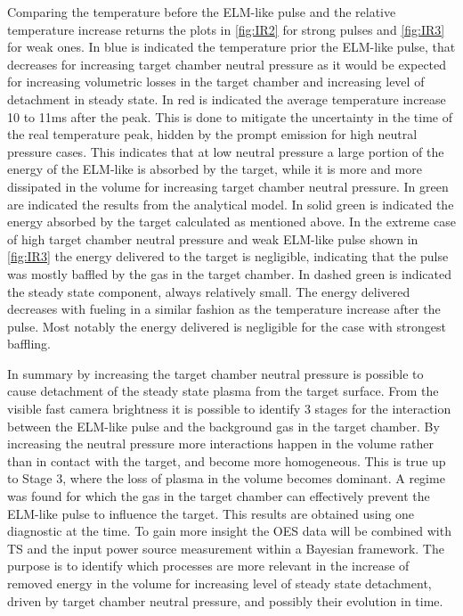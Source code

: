 Comparing the temperature before the ELM-like pulse and the relative temperature increase returns the plots in \autoref{fig:IR2} for strong pulses and \autoref{fig:IR3} for weak ones.  In blue is indicated the temperature prior the ELM-like pulse, that decreases for increasing target chamber neutral pressure as it would be expected for increasing volumetric losses in the target chamber and increasing level of detachment in steady state. In red is indicated the average temperature increase 10 to 11ms after the peak. This is done to mitigate the uncertainty in the time of the real temperature peak, hidden by the prompt emission for high neutral pressure cases. This indicates that at low neutral pressure a large portion of the energy of the ELM-like is absorbed by the target, while it is more and more dissipated in the volume for increasing target chamber neutral pressure. In green are indicated the results from the analytical model. In solid green is indicated the energy absorbed by the target calculated as mentioned above. In the extreme case of high target chamber neutral pressure and weak ELM-like pulse shown in \autoref{fig:IR3} the energy delivered to the target is negligible, indicating that the pulse was mostly baffled by the gas in the target chamber. In dashed green is indicated the steady state component, always relatively small. The energy delivered decreases with fueling in a similar fashion as the temperature increase after the pulse. Most notably the energy delivered is negligible for the case with strongest baffling.

In summary by increasing the target chamber neutral pressure is possible to cause detachment of the steady state plasma from the target surface. From the visible fast camera brightness it is possible to identify 3 stages for the interaction between the ELM-like pulse and the background gas in the target chamber. By increasing the neutral pressure more interactions happen in the volume rather than in contact with the target, and become more homogeneous. This is true up to Stage 3, where the loss of plasma in the volume becomes dominant. A regime was found for which the gas in the target chamber can effectively prevent the ELM-like pulse to influence the target.
This results are obtained using one diagnostic at the time. To gain more insight the OES data will be combined with TS and the input power source measurement within a Bayesian framework. The purpose is to identify which processes are more relevant in the increase of removed energy in the volume for increasing level of steady state detachment, driven by target chamber neutral pressure, and possibly their evolution in time.

